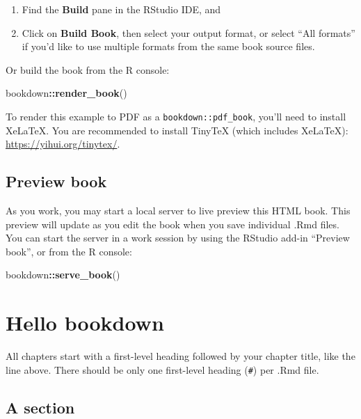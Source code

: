 \documentclass[
]{book}
\newenvironment{Shaded}{\begin{snugshade}}{\end{snugshade}}
\newcommand{\FunctionTok}[1]{\textcolor[rgb]{0.13,0.29,0.53}{\textbf{#1}}}
\newcommand{\NormalTok}[1]{#1}
\newcommand{\SpecialCharTok}[1]{\textcolor[rgb]{0.81,0.36,0.00}{\textbf{#1}}}
\theoremstyle{definition}
\theoremstyle{definition}
\theoremstyle{definition}
\theoremstyle{definition}
\theoremstyle{remark}
\begin{document}
\begin{enumerate}
\def\labelenumi{\arabic{enumi}.}
\item
  Find the \textbf{Build} pane in the RStudio IDE, and
\item
  Click on \textbf{Build Book}, then select your output format, or select ``All formats'' if you'd like to use multiple formats from the same book source files.
\end{enumerate}

Or build the book from the R console:

\begin{Shaded}
\begin{Highlighting}[]
\NormalTok{bookdown}\SpecialCharTok{::}\FunctionTok{render\_book}\NormalTok{()}
\end{Highlighting}
\end{Shaded}

To render this example to PDF as a \texttt{bookdown::pdf\_book}, you'll need to install XeLaTeX. You are recommended to install TinyTeX (which includes XeLaTeX): \url{https://yihui.org/tinytex/}.

\hypertarget{preview-book}{%
\subsection{Preview book}\label{preview-book}}

As you work, you may start a local server to live preview this HTML book. This preview will update as you edit the book when you save individual .Rmd files. You can start the server in a work session by using the RStudio add-in ``Preview book'', or from the R console:

\begin{Shaded}
\begin{Highlighting}[]
\NormalTok{bookdown}\SpecialCharTok{::}\FunctionTok{serve\_book}\NormalTok{()}
\end{Highlighting}
\end{Shaded}

\hypertarget{hello-bookdown}{%
\section{Hello bookdown}\label{hello-bookdown}}

All chapters start with a first-level heading followed by your chapter title, like the line above. There should be only one first-level heading (\texttt{\#}) per .Rmd file.

\hypertarget{a-section}{%
\subsection{A section}\label{a-section}}
\end{document}
